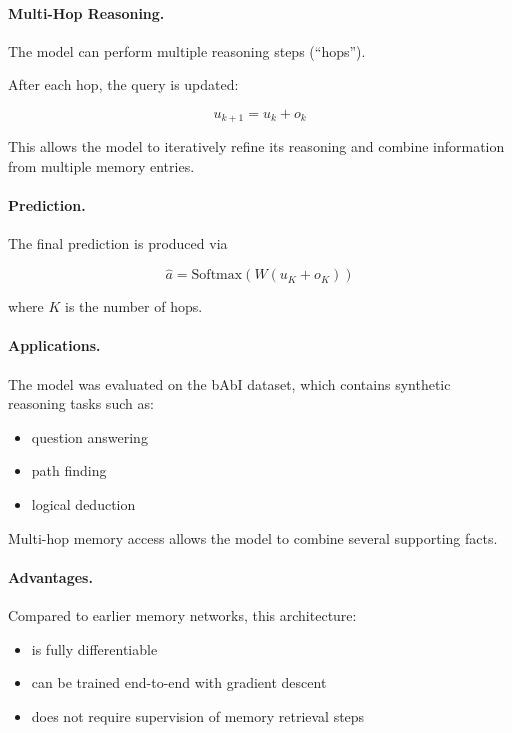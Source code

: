 \documentclass[12pt]{article}
\begin{document}
\paragraph{Multi-Hop Reasoning.}

The model can perform multiple reasoning steps (``hops'').

After each hop, the query is updated:

\[
		u_{k+1} = u_k + o_k
\]

This allows the model to iteratively refine its reasoning and combine
information from multiple memory entries.

\paragraph{Prediction.}

The final prediction is produced via

\[
		\hat{a} = \text{Softmax}(W(u_K + o_K))
\]

where $K$ is the number of hops.

\paragraph{Applications.}

The model was evaluated on the bAbI dataset, which contains
synthetic reasoning tasks such as:

\begin{itemize}
		\item question answering
		\item path finding
		\item logical deduction
\end{itemize}

Multi-hop memory access allows the model to combine several supporting facts.

\paragraph{Advantages.}

Compared to earlier memory networks, this architecture:

\begin{itemize}
		\item is fully differentiable
		\item can be trained end-to-end with gradient descent
		\item does not require supervision of memory retrieval steps
\end{itemize}
\end{document}
